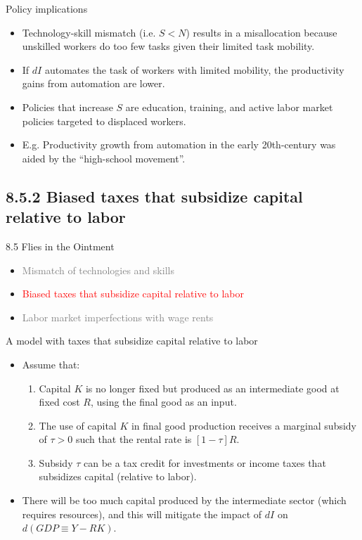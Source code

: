 \documentclass[notes=show]{beamer}
\begin{document}
\begin{frame}{Policy implications}
\begin{itemize}
\item Technology-skill mismatch (i.e. $S<N$) results in a misallocation because unskilled workers do too few tasks given their limited task mobility. \medskip
\item If $dI$ automates the task of workers with limited mobility, the productivity gains from automation are lower. \medskip
\item Policies that increase $S$ are education, training, and active labor market policies targeted to displaced workers. \medskip
\item E.g. Productivity growth from automation in the early 20th-century was aided by the ``high-school movement''.
\end{itemize}
\end{frame}

\subsection{8.5.2 Biased taxes that subsidize capital relative to labor}

\begin{frame}{8.5 Flies in the Ointment}
\begin{itemize}
\item[\textcolor{gray}{8.5.1}] \textcolor{gray}{Mismatch of technologies and skills} \bigskip
\item[\textcolor{red}{8.5.2}] \textcolor{red}{Biased taxes that subsidize capital relative to labor} \bigskip
\item[\textcolor{gray}{8.5.3}] \textcolor{gray}{Labor market imperfections with wage rents}
\end{itemize}
\end{frame}

\begin{frame}{A model with taxes that subsidize capital relative to labor}
\begin{itemize}
\item Assume that: \medskip
\begin{enumerate}
\item Capital $K$ is no longer fixed but produced as an intermediate good at fixed cost $R$, using the final good as an input. \medskip
\item The use of capital $K$ in final good production receives a marginal subsidy of $\tau>0$ such that the rental rate is $[1-\tau]R$. \medskip
\item Subsidy $\tau$ can be a tax credit for investments or income taxes that subsidizes capital (relative to labor). \medskip
\end{enumerate}
\item There will be too much capital produced by the intermediate sector (which requires resources), and this will mitigate the impact of $dI$ on $d(GDP \equiv Y-RK)$. 
\end{itemize}
\end{frame}
\end{document}
